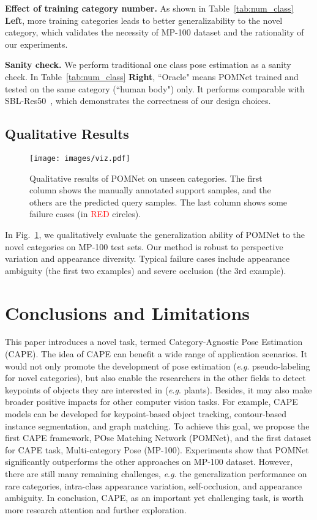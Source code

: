 \documentclass[runningheads]{llncs}
\newcommand{\eg}{\textit{e}.\textit{g}. }
\begin{document}
{\textbf{Effect of training category number.} As shown in Table~\ref{tab:num_class} \textbf{Left}, more training categories leads to better generalizability to the novel category, which validates the necessity of MP-100 dataset and the rationality of our experiments.

\textbf{Sanity check.} We perform traditional one class pose estimation as a sanity check. In Table~\ref{tab:num_class} \textbf{Right}, ``Oracle" means POMNet trained and tested on the same category (``human body") only. It performs comparable with SBL-Res50~\cite{he2016deep}, which demonstrates the correctness of our design choices.


\subsection{Qualitative Results}

\begin{figure}[t]
	\centering
	\texttt{[image: images/viz.pdf]}
	\caption{Qualitative results of POMNet on unseen categories. The first column shows the manually annotated support samples, and the others are the predicted query samples. The last column shows some failure cases (in \textcolor{red}{RED} circles).
	}
	\label{fig:viz}
\end{figure}

In Fig.~\ref{fig:viz}, we qualitatively evaluate the generalization ability of POMNet to the novel categories on MP-100 test sets. Our method is robust to perspective variation and appearance diversity. Typical failure cases include appearance ambiguity (the first two examples) and severe occlusion (the 3rd example).

\section{Conclusions and Limitations}

This paper introduces a novel task, termed Category-Agnostic Pose Estimation (CAPE). The idea of CAPE can benefit a wide range of application scenarios. It would not only promote the development of pose estimation (\eg pseudo-labeling for novel categories), but also enable the researchers in the other fields to detect keypoints of objects they are interested in (\eg plants). Besides, it may also make broader positive impacts for other computer vision tasks. For example, CAPE models can be developed for keypoint-based object tracking, contour-based instance segmentation, and graph matching. To achieve this goal, we propose the first CAPE framework, POse Matching Network (POMNet), and the first dataset for CAPE task, Multi-category Pose (MP-100). Experiments show that POMNet significantly outperforms the other approaches on MP-100 dataset. 
However, there are still many remaining challenges, \eg the generalization performance on rare categories, intra-class appearance variation, self-occlusion, and appearance ambiguity.
In conclusion, CAPE, as an important yet challenging task, is worth more research attention and further exploration.

}
\end{document}
